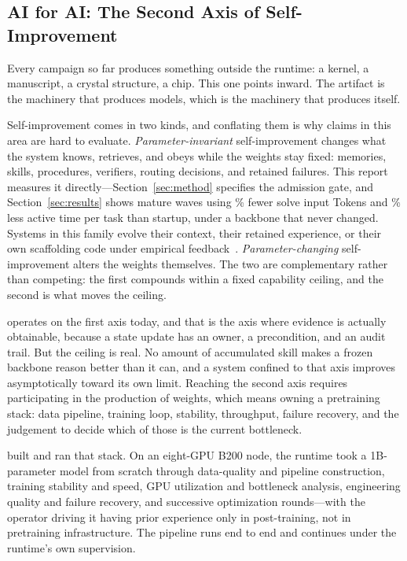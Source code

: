 \subsection{AI for AI: The Second Axis of Self-Improvement}
\label{sec:rsi-vertical}

Every campaign so far produces something outside the runtime: a kernel, a manuscript,
a crystal structure, a chip. This one points inward. The artifact is the machinery
that produces models, which is the machinery that produces \systemname{} itself.

Self-improvement comes in two kinds, and conflating them is why claims in this area
are hard to evaluate. \emph{Parameter-invariant} self-improvement changes what the
system knows, retrieves, and obeys while the weights stay fixed: memories, skills,
procedures, verifiers, routing decisions, and retained failures. This report measures
it directly---Section~\ref{sec:method} specifies the admission gate, and
Section~\ref{sec:results} shows mature waves using \SWEProTokenReduction\% fewer
solve input Tokens and \SWEProTimeReduction\% less active time per task than startup,
under a backbone that never changed. Systems in this family evolve their
context, their retained experience, or their own scaffolding code under empirical
feedback~\citep{zhang2025ace,yin2025godelagent,zhang2025darwingodel}. \emph{Parameter-changing}
self-improvement alters the weights themselves. The two are complementary rather than competing: the
first compounds within a fixed capability ceiling, and the second is what moves the
ceiling.

\systemname{} operates on the first axis today, and that is the axis where evidence
is actually obtainable, because a state update has an owner, a precondition, and an
audit trail. But the ceiling is real. No amount of accumulated skill makes a frozen
backbone reason better than it can, and a system confined to that axis improves
asymptotically toward its own limit. Reaching the second axis requires participating
in the production of weights, which means owning a pretraining stack: data pipeline,
training loop, stability, throughput, failure recovery, and the judgement to decide
which of those is the current bottleneck.

\systemname{} built and ran that stack. On an eight-GPU B200 node, the runtime took a
1B-parameter model from scratch through data-quality and pipeline construction,
training stability and speed, GPU utilization and bottleneck analysis, engineering
quality and failure recovery, and successive optimization rounds---with the operator
driving it having prior experience only in post-training, not in pretraining
infrastructure. The pipeline runs end to end and continues under the runtime's own
supervision.

